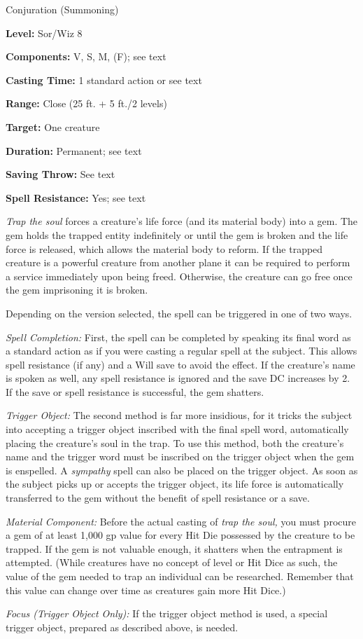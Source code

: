 
Conjuration (Summoning)

\textbf{Level:} Sor/Wiz 8

\textbf{Components:} V, S, M, (F); see text

\textbf{Casting Time:} 1 standard action or see text

\textbf{Range:} Close (25 ft. + 5 ft./2 levels)

\textbf{Target:} One creature

\textbf{Duration:} Permanent; see text

\textbf{Saving Throw:} See text

\textbf{Spell Resistance:} Yes; see text

\textit{Trap the soul} forces a creature's life force (and its material body) into 
a gem. The gem holds the trapped entity indefinitely or until the gem is broken 
and the life force is released, which allows the material body to reform. If the 
trapped creature is a powerful creature from another plane it can be required to 
perform a service immediately upon being freed. Otherwise, the creature can go 
free once the gem imprisoning it is broken.

Depending on the version selected, the spell can be triggered in one of two ways.

\textit{Spell Completion:} First, the spell can be completed by speaking its final 
word as a standard action as if you were casting a regular spell at the subject. 
This allows spell resistance (if any) and a Will save to avoid the effect. If the 
creature's name is spoken as well, any spell resistance is ignored and the save 
DC increases by 2. If the save or spell resistance is successful, the gem shatters.

\textit{Trigger Object:} The second method is far more insidious, for it tricks 
the subject into accepting a trigger object inscribed with the final spell word, 
automatically placing the creature's soul in the trap. To use this method, both 
the creature's name and the trigger word must be inscribed on the trigger object 
when the gem is enspelled. A \textit{sympathy} spell can also be placed on the 
trigger object. As soon as the subject picks up or accepts the trigger object, 
its life force is automatically transferred to the gem without the benefit of spell 
resistance or a save.

\textit{Material Component:} Before the actual casting of \textit{trap the soul, 
}you must procure a gem of at least 1,000 gp value for every Hit Die possessed 
by the creature to be trapped. If the gem is not valuable enough, it shatters when 
the entrapment is attempted. (While creatures have no concept of level or Hit Dice 
as such, the value of the gem needed to trap an individual can be researched. Remember 
that this value can change over time as creatures gain more Hit Dice.)

\textit{Focus (Trigger Object Only):} If the trigger object method is used, a special 
trigger object, prepared as described above, is needed.

